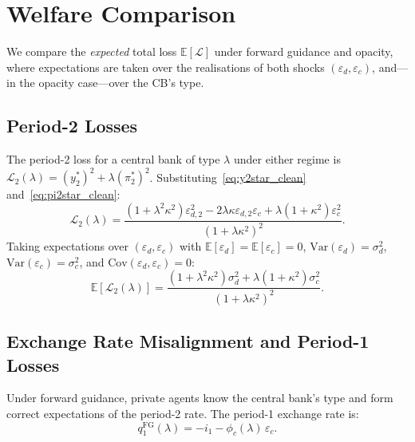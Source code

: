 
\section{Welfare Comparison}
\label{sec:welfare}

We compare the \emph{expected} total loss $\mathbb{E}[\mathcal{L}]$ under forward
guidance and opacity, where expectations are taken over the realisations of both shocks
$(\varepsilon_d, \varepsilon_c)$, and---in the opacity case---over the CB's type.

\subsection{Period-2 Losses}

The period-2 loss for a central bank of type $\lambda$ under either regime is
$\mathcal{L}_2(\lambda) = (y_2^*)^2 + \lambda(\pi_2^*)^2$.
Substituting~\eqref{eq:y2star_clean} and~\eqref{eq:pi2star_clean}:
\begin{equation}
  \mathcal{L}_2(\lambda)
    = \frac{(1 + \lambda^2\kappa^2)\varepsilon_{d,2}^2
            - 2\lambda\kappa\varepsilon_{d,2}\varepsilon_c
            + \lambda(1 + \kappa^2)\varepsilon_c^2}{(1+\lambda\kappa^2)^2}.
  \label{eq:L2_realized}
\end{equation}
Taking expectations over $(\varepsilon_d, \varepsilon_c)$ with
$\mathbb{E}[\varepsilon_d] = \mathbb{E}[\varepsilon_c] = 0$,
$\mathrm{Var}(\varepsilon_d) = \sigma_d^2$, $\mathrm{Var}(\varepsilon_c) = \sigma_c^2$,
and $\mathrm{Cov}(\varepsilon_d,\varepsilon_c) = 0$:
\begin{equation}
  \mathbb{E}[\mathcal{L}_2(\lambda)]
    = \frac{(1+\lambda^2\kappa^2)\sigma_d^2
            + \lambda(1+\kappa^2)\sigma_c^2}{(1+\lambda\kappa^2)^2}.
  \label{eq:EL2_type}
\end{equation}

\subsection{Exchange Rate Misalignment and Period-1 Losses}

Under forward guidance, private agents know the central bank's type and form correct
expectations of the period-2 rate. The period-1 exchange rate is:
\begin{equation}
  q_1^{\mathrm{FG}}(\lambda) = -i_1 - \phi_c(\lambda)\,\varepsilon_c.
  \label{eq:q1_FG}
\end{equation}

